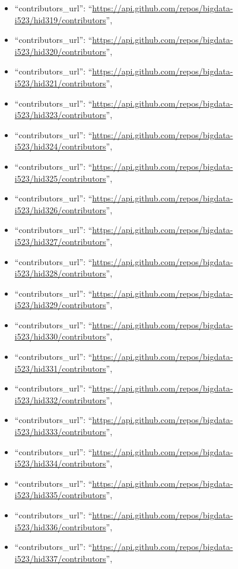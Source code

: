 \begin{itemize}
\item
  ``contributors\_url'':
  ``\url{https://api.github.com/repos/bigdata-i523/hid319/contributors}'',
\item
  ``contributors\_url'':
  ``\url{https://api.github.com/repos/bigdata-i523/hid320/contributors}'',
\item
  ``contributors\_url'':
  ``\url{https://api.github.com/repos/bigdata-i523/hid321/contributors}'',
\item
  ``contributors\_url'':
  ``\url{https://api.github.com/repos/bigdata-i523/hid323/contributors}'',
\item
  ``contributors\_url'':
  ``\url{https://api.github.com/repos/bigdata-i523/hid324/contributors}'',
\item
  ``contributors\_url'':
  ``\url{https://api.github.com/repos/bigdata-i523/hid325/contributors}'',
\item
  ``contributors\_url'':
  ``\url{https://api.github.com/repos/bigdata-i523/hid326/contributors}'',
\item
  ``contributors\_url'':
  ``\url{https://api.github.com/repos/bigdata-i523/hid327/contributors}'',
\item
  ``contributors\_url'':
  ``\url{https://api.github.com/repos/bigdata-i523/hid328/contributors}'',
\item
  ``contributors\_url'':
  ``\url{https://api.github.com/repos/bigdata-i523/hid329/contributors}'',
\item
  ``contributors\_url'':
  ``\url{https://api.github.com/repos/bigdata-i523/hid330/contributors}'',
\item
  ``contributors\_url'':
  ``\url{https://api.github.com/repos/bigdata-i523/hid331/contributors}'',
\item
  ``contributors\_url'':
  ``\url{https://api.github.com/repos/bigdata-i523/hid332/contributors}'',
\item
  ``contributors\_url'':
  ``\url{https://api.github.com/repos/bigdata-i523/hid333/contributors}'',
\item
  ``contributors\_url'':
  ``\url{https://api.github.com/repos/bigdata-i523/hid334/contributors}'',
\item
  ``contributors\_url'':
  ``\url{https://api.github.com/repos/bigdata-i523/hid335/contributors}'',
\item
  ``contributors\_url'':
  ``\url{https://api.github.com/repos/bigdata-i523/hid336/contributors}'',
\item
  ``contributors\_url'':
  ``\url{https://api.github.com/repos/bigdata-i523/hid337/contributors}'',

\end{itemize}
